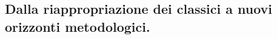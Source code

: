 \subsection{Dalla riappropriazione dei classici a nuovi orizzonti metodologici.}\label{DallaRiappropriazioneDeiClassiciANuoviOrizzontiMetodologici}




